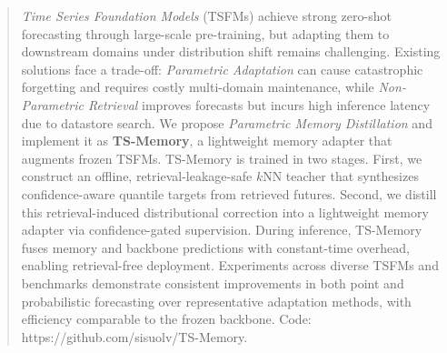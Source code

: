 \documentclass[sigconf]{acmart}
\begin{document}
\begin{abstract}


\textit{Time Series Foundation Models} (TSFMs) achieve strong zero-shot forecasting through large-scale pre-training, but adapting them to downstream domains under distribution shift remains challenging. Existing solutions face a trade-off: \textit{Parametric Adaptation} can cause catastrophic forgetting and requires costly multi-domain maintenance, while \textit{Non-Parametric Retrieval} improves forecasts but incurs high inference latency due to datastore search. We propose \textit{Parametric Memory Distillation} and implement it as \textbf{TS-Memory}, a lightweight memory adapter that augments frozen TSFMs. 
TS-Memory is trained in two stages. First, we construct an offline, retrieval-leakage-safe $k$NN teacher that synthesizes confidence-aware quantile targets from retrieved futures. Second, we distill this retrieval-induced distributional correction into a lightweight memory adapter via confidence-gated supervision.
During inference, TS-Memory fuses memory and backbone predictions with constant-time overhead, enabling retrieval-free deployment. Experiments across diverse TSFMs and benchmarks demonstrate consistent improvements in both point and probabilistic forecasting over representative adaptation methods, with efficiency comparable to the frozen backbone. Code: https://github.com/sisuolv/TS-Memory.

\end{abstract}
\end{document}
